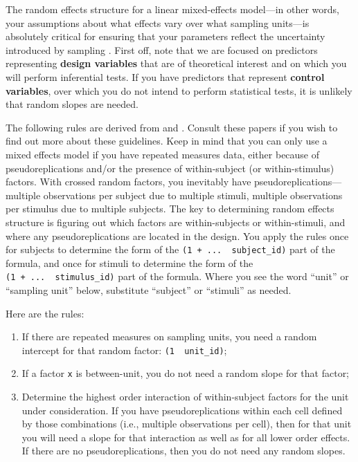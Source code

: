 \documentclass[]{book}
\providecommand{\tightlist}{%
  \setlength{\itemsep}{0pt}\setlength{\parskip}{0pt}}
\begin{document}
The random effects structure for a linear mixed-effects model---in other words, your assumptions about what effects vary over what sampling units---is absolutely critical for ensuring that your parameters reflect the uncertainty introduced by sampling \citep{Barr_et_al_2013}. First off, note that we are focused on predictors representing \textbf{design variables} that are of theoretical interest and on which you will perform inferential tests. If you have predictors that represent \textbf{control variables}, over which you do not intend to perform statistical tests, it is unlikely that random slopes are needed.

The following rules are derived from \citet{Barr_et_al_2013} and \citet{Barr_2013}. Consult these papers if you wish to find out more about these guidelines. Keep in mind that you can only use a mixed effects model if you have repeated measures data, either because of pseudoreplications and/or the presence of within-subject (or within-stimulus) factors. With crossed random factors, you inevitably have pseudoreplications---multiple observations per subject due to multiple stimuli, multiple observations per stimulus due to multiple subjects. The key to determining random effects structure is figuring out which factors are within-subjects or within-stimuli, and where any pseudoreplications are located in the design. You apply the rules once for subjects to determine the form of the \texttt{(1\ +\ ...\ \textbar{}\ subject\_id)} part of the formula, and once for stimuli to determine the form of the \texttt{(1\ +\ ...\ \textbar{}\ stimulus\_id)} part of the formula. Where you see the word ``unit'' or ``sampling unit'' below, substitute ``subject'' or ``stimuli'' as needed.

Here are the rules:

\begin{enumerate}
\def\labelenumi{\arabic{enumi}.}
\tightlist
\item
  If there are repeated measures on sampling units, you need a random intercept for that random factor: \texttt{(1\ \textbar{}\ unit\_id)};
\item
  If a factor \texttt{x} is between-unit, you do not need a random slope for that factor;
\item
  Determine the highest order interaction of within-subject factors for the unit under consideration. If you have pseudoreplications within each cell defined by those combinations (i.e., multiple observations per cell), then for that unit you will need a slope for that interaction as well as for all lower order effects. If there are no pseudoreplications, then you do not need any random slopes.
\end{enumerate}
\end{document}
